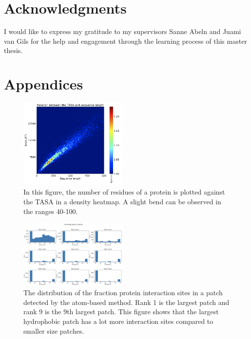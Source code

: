 \documentclass[11pt,a4paper]{article}
\begin{document}
\section*{Acknowledgments}
I would like to express my gratitude to my supervisors Sanne Abeln and Juami van Gils for the help and engagement through the learning process of this master thesis. 




\appendix

\section{Appendices}
\label{sec:appendix}

\begin{figure}[h!]
  \centering
  \includegraphics[width=0.48\textwidth]{figures/TASA_LENGTH.png}
  \caption{In this figure, the number of residues of a protein is plotted against the TASA in a density heatmap. A slight bend can be observed in the ranges 40-100.
}
  \label{s3}
\end{figure}

\begin{figure}[h!]
  \centering
  \includegraphics[width=0.48\textwidth]{figures/s1.png}
  \caption{The distribution of the fraction protein interaction sites in a patch detected by the atom-based method. Rank 1 is the largest patch and rank 9 is the 9th largest patch. This figure shows that the largest hydrophobic patch has a lot more interaction sites compared to smaller size patches.
}
  \label{s1}
\end{figure}
\end{document}
